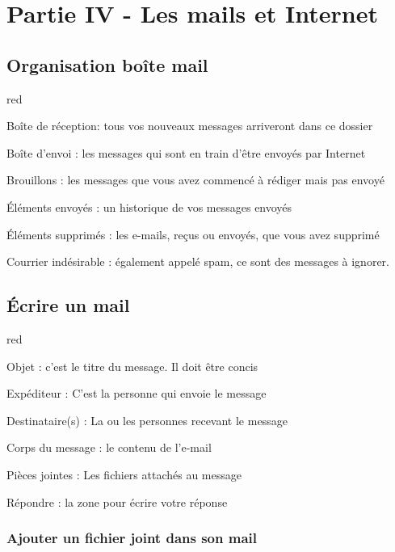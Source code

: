 \section{Partie IV - Les mails et Internet}

\subsection{Organisation boîte mail}

\begin{items}{red}{\Circle}
\item Boîte de réception: tous vos nouveaux messages arriveront dans ce dossier
\item Boîte d’envoi : les messages qui sont en train d’être envoyés par Internet
\item Brouillons : les messages que vous avez commencé à rédiger mais pas envoyé
\item Éléments envoyés : un historique de vos messages envoyés
\item Éléments supprimés : les e-mails, reçus ou envoyés, que vous avez supprimé
\item Courrier indésirable : également appelé spam, ce sont des messages à ignorer. 

\end{items}

\subsection{Écrire un mail}

\begin{items}{red}{\Circle}
\item Objet : c’est le titre du message. Il doit être concis
\item Expéditeur : C’est la personne qui envoie le message
\item Destinataire(s) : La ou les personnes recevant le message
\item Corps du message : le contenu de l’e-mail
\item Pièces jointes : Les fichiers attachés au message
\item Répondre : la zone pour écrire votre réponse
\end{items}

\subsubsection{Ajouter un fichier joint dans son mail}

